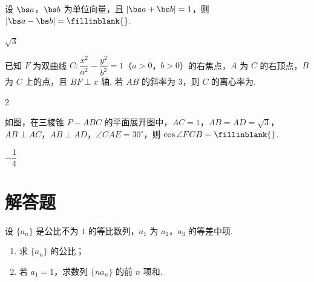 \begin{problem}
设 \(\bs a\)，\(\bs b\) 为单位向量，且 \(\left\lvert \bs a+\bs b \right\rvert=1\)，则 \(\left\lvert \bs a-\bs b \right\rvert=\fillinblank{}\).

\begin{answer}
\(\sqrt{3}\)
\end{answer}
\end{problem}

\begin{problem}
已知 \(F\) 为双曲线 \(C:\dfrac{x^2}{a^2}-\dfrac{y^2}{b^2}=1\)（\(a>0\)，\(b>0\)）的右焦点，\(A\) 为 \(C\) 的右顶点，\(B\) 为 \(C\) 上的点，且 \(BF\perp x\) 轴. 若 \(AB\) 的斜率为 \(3\)，则 \(C\) 的离心率为\fillinblank{}.

\begin{answer}
2
\end{answer}
\end{problem}

\begin{problem}
如图，在三棱锥 \(P-ABC\) 的平面展开图中，\(AC=1\)，\(AB=AD=\sqrt{3}\)，\(AB\perp AC\)，\(AB\perp AD\)，\(\angle CAE=30^\circ\)，则 \(\cos \angle FCB=\fillinblank{}\).


\begin{answer}
\(-\dfrac{1}{4}\)
\end{answer}
\end{problem}

\section{解答题}

\begin{problem}
设 \(\{a_n\}\) 是公比不为 \(1\) 的等比数列，\(a_1\) 为 \(a_2\)，\(a_3\) 的等差中项.

\begin{enumerate}
\item 求 \(\{a_n\}\) 的公比；

\item 若 \(a_1=1\)，求数列 \(\{na_n\}\) 的前 \(n\) 项和.
\end{enumerate}
\end{problem}

